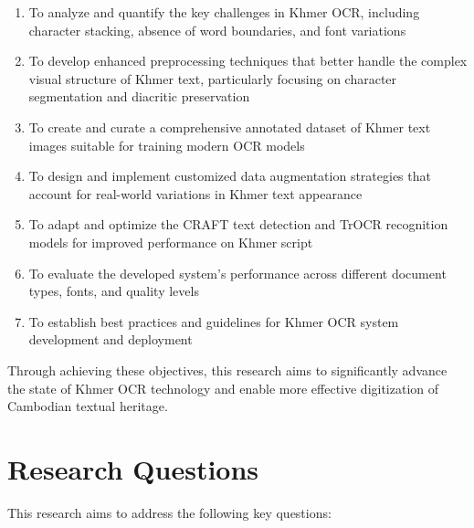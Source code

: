 \begin{enumerate}
    \item To analyze and quantify the key challenges in Khmer OCR, including character stacking, absence of word boundaries, and font variations
    
    \item To develop enhanced preprocessing techniques that better handle the complex visual structure of Khmer text, particularly focusing on character segmentation and diacritic preservation
    
    \item To create and curate a comprehensive annotated dataset of Khmer text images suitable for training modern OCR models
    
    \item To design and implement customized data augmentation strategies that account for real-world variations in Khmer text appearance
    
    \item To adapt and optimize the CRAFT text detection and TrOCR recognition models for improved performance on Khmer script
    
    \item To evaluate the developed system's performance across different document types, fonts, and quality levels
    
    \item To establish best practices and guidelines for Khmer OCR system development and deployment
\end{enumerate}

Through achieving these objectives, this research aims to significantly advance the state of Khmer OCR technology and enable more effective digitization of Cambodian textual heritage.

\section{Research Questions}
\label{sec:questions}

This research aims to address the following key questions:

